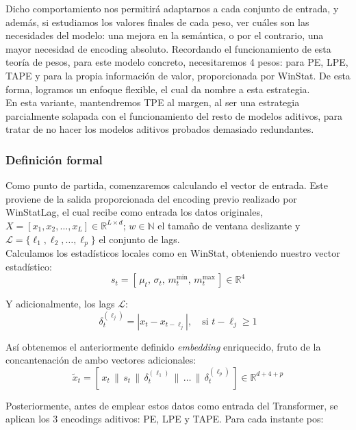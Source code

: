 Dicho comportamiento nos permitirá adaptarnos a cada conjunto de entrada, y además, si estudiamos los valores finales de cada peso, ver cuáles son las necesidades del modelo: una mejora en la semántica, o por el contrario, una mayor necesidad de encoding absoluto. Recordando el funcionamiento de esta teoría de pesos, para este modelo concreto, necesitaremos 4 pesos: para PE, LPE, TAPE y para la propia información de valor, proporcionada por WinStat. De esta forma, logramos un enfoque flexible, el cual da nombre a esta estrategia.\\

En esta variante, mantendremos TPE al margen, al ser una estrategia parcialmente solapada con el funcionamiento del resto de modelos aditivos, para tratar de no hacer los modelos aditivos probados demasiado redundantes.

\subsubsection{Definición formal}

Como punto de partida, comenzaremos calculando el vector de entrada. Este proviene de la salida proporcionada del encoding previo realizado por WinStatLag, el cual recibe como entrada los datos originales, $X = [x_1, x_2, \dots, x_L] \in \mathbb{R}^{L \times d}$; $w \in \mathbb{N}$ el tamaño de ventana deslizante y $\mathcal{L} = \{\ell_1, \ell_2, \dots, \ell_p\}$ el conjunto de lags.\\


Calculamos los estadísticos locales como en WinStat, obteniendo nuestro vector estadístico:
\[
s_t = [\,\mu_t,\, \sigma_t,\, m^{\min}_t,\, m^{\max}_t\,] \in \mathbb{R}^4
\]

Y adicionalmente, los lags $\mathcal{L}$:
\[
\delta_t^{(\ell_j)} = | x_t - x_{t - \ell_j}|, \quad \text{si } t - \ell_j \geq 1
\]

Así obtenemos el anteriormente definido \textit{embedding} enriquecido, fruto de la concantenación de ambo vectores adicionales:
\[
\tilde{x}_t = [\,x_t \,\|\, s_t \,\|\, \delta_t^{(\ell_1)} \,\|\, \dots \,\|\, \delta_t^{(\ell_p)}\,] \in \mathbb{R}^{d + 4 + p}
\]

Posteriormente, antes de emplear estos datos como entrada del Transformer, se aplican los 3 encodings aditivos: PE, LPE y TAPE. Para cada instante pos:

